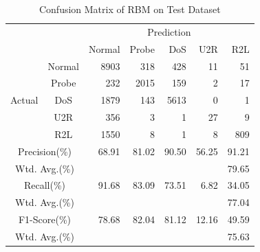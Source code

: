 \begin{table}[t]
    \caption{Confusion Matrix of RBM on Test Dataset}
    \centering
    \begin{tabular}{cc|rrrrr}
        \hline
        &  & \multicolumn{5}{c}{Prediction} \\
                        &        & Normal & Probe & DoS & U2R & R2L\\
        \hline
        \hline
        \multirow{5}{*}{Actual} & Normal & 8903 &  318 &  428 &  11 &   51 \\
                                & Probe  &  232 & {\color{red}2015} &  159 &   2 &   17 \\
                                & DoS    & 1879 &  143 & 5613 &   0 &    1 \\
                                & U2R    &  356 &    3 &    1 &  27 &    9 \\
                                & R2L    & 1550 &    8 &    1 &   8 &  809 \\
        \hline
        \multicolumn{2}{c|}{Precision(\%)}   & 68.91& 81.02& 90.50& 56.25& 91.21\\
        \multicolumn{2}{c|}{Wtd. Avg.(\%)}   & \multicolumn{5}{r}{79.65}\\
        \hline
        \multicolumn{2}{c|}{Recall(\%)}      & 91.68& 83.09& 73.51&  6.82& 34.05\\
        \multicolumn{2}{c|}{Wtd. Avg.(\%)}   & \multicolumn{5}{r}{77.04}\\
        \hline
        \multicolumn{2}{c|}{F1-Score(\%)}    & 78.68& 82.04& 81.12& 12.16& 49.59\\
        \multicolumn{2}{c|}{Wtd. Avg.(\%)}   & \multicolumn{5}{r}{75.63}\\
        \hline
    \end{tabular}
    \label{Tab:ConfusionMatrixRBM}
\end{table}


